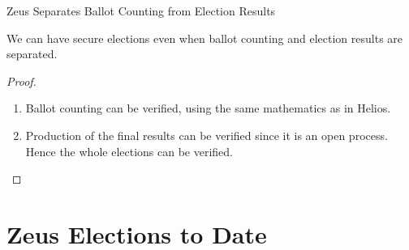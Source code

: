 \documentclass[utf8]{beamer}
\begin{document}
\begin{frame}{Zeus Separates Ballot Counting from Election Results}
  
  \begin{theorem}
    We can have secure elections even when ballot counting and election
    results are separated.
  \end{theorem}

\begin{proof}
  \begin{enumerate}
  \item<1-> Ballot counting can be verified, using the same mathematics
    as in Helios.
  \item<2-> Production of the final results can be verified since it is
    an open process. Hence the whole elections can be verified.\qedhere
  \end{enumerate}
\end{proof}

\end{frame}

\section{Zeus Elections to Date}



  
\end{document}
